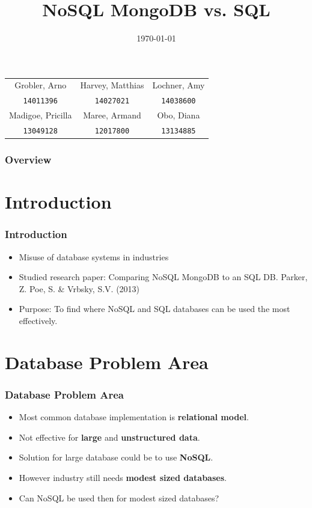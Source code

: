 \documentclass{beamer}
\title[NoSQL MongoDB vs. SQL ]{NoSQL MongoDB vs. SQL}
\author{}
\institute[UP]{
	Department of Computer Science, University of Pretoria
}
\date{\today}
\begin{document}
\begin{frame}
	\titlepage
	\begin{center}
		\begin{tabular}{ c c c }
			Grobler, Arno & Harvey, Matthias & Lochner, Amy  \\
			\texttt{14011396} & \texttt{14027021} & \texttt{14038600} \\
			Madigoe, Pricilla & Maree, Armand & Obo, Diana \\
			\texttt{13049128} & \texttt{12017800} & \texttt{13134885} \\				
		\end{tabular}
	\end{center}
\end{frame}

\begin{frame}
	\frametitle{Overview}
	\tableofcontents
\end{frame}

	\section{Introduction}
		\begin{frame}
		\frametitle{Introduction}
	        \begin{itemize}
	            \item Misuse of database systems in industries 
				\item Studied research paper: Comparing NoSQL MongoDB to an SQL DB. Parker, Z. Poe, S. & Vrbsky, S.V. (2013)
				\item Purpose: To find where NoSQL and SQL databases can be used the most effectively.
			\end{itemize}
		\end{frame}
	
	\section{Database Problem Area}
		\begin{frame}
		\frametitle{Database Problem Area}
            \begin{itemize}
	            \item Most common database implementation is \textbf{relational model}.
				\item Not effective for \textbf{large} and \textbf{unstructured data}.
				\item Solution for large database could be to use \textbf{NoSQL}.
				\item However industry still needs \textbf{modest sized databases}.
				\item Can NoSQL be used then for modest sized databases?
			\end{itemize}
		\end{frame}
			
\end{document}
